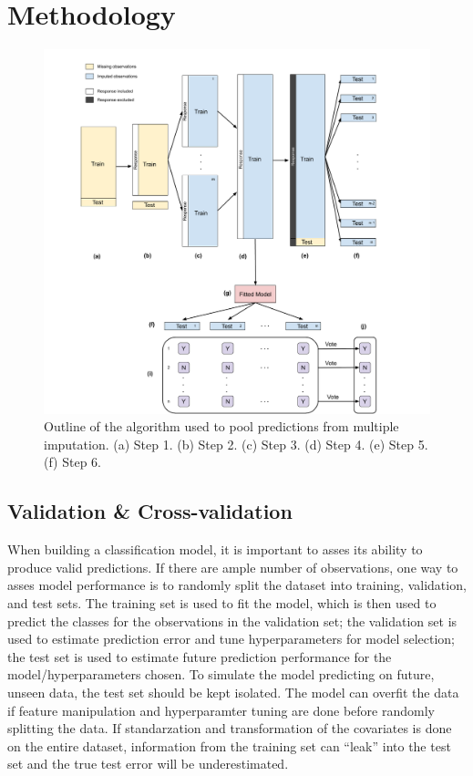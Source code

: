 \documentclass[12pt,]{article}
\begin{document}
\newpage

\section{Methodology}\label{methodology}

\begin{figure}[H]

{\centering \includegraphics[width=1\linewidth]{images/ensemble-imputation} 

}

\caption{\label{fig.ensemble-imputation}Outline of the algorithm used to pool predictions from multiple imputation.  (a) Step 1. (b) Step 2. (c) Step 3. (d) Step 4.  (e) Step 5.  (f) Step 6.}\label{fig:ensemble-imputation}
\end{figure}

\subsection{Validation \&
Cross-validation}\label{validation-cross-validation}

When building a classification model, it is important to asses its
ability to produce valid predictions. If there are ample number of
observations, one way to asses model performance is to randomly split
the dataset into training, validation, and test sets. The training set
is used to fit the model, which is then used to predict the classes for
the observations in the validation set; the validation set is used to
estimate prediction error and tune hyperparameters for model selection;
the test set is used to estimate future prediction performance for the
model/hyperparameters chosen. To simulate the model predicting on
future, unseen data, the test set should be kept isolated. The model can
overfit the data if feature manipulation and hyperparamter tuning are
done before randomly splitting the data. If standarzation and
transformation of the covariates is done on the entire dataset,
information from the training set can ``leak'' into the test set and the
true test error will be underestimated.
\end{document}
